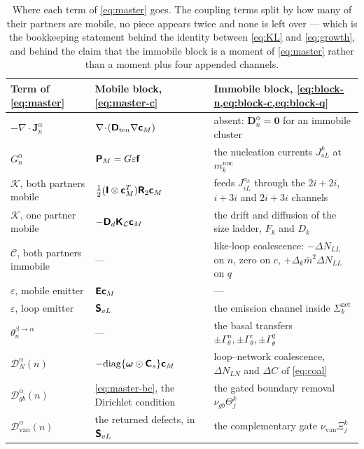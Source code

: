 \begin{table}[htbp]
\centering
\small
\caption{Where each term of \cref{eq:master} goes. The coupling terms split by
how many of their partners are mobile, no piece appears twice and none is left
over --- which is the bookkeeping statement behind the identity between
\cref{eq:KL} and \cref{eq:growth}, and behind the claim that the immobile block
is a moment of \cref{eq:master} rather than a moment plus four appended
channels.}
\label{tab:d-terms}
\begin{tabularx}{\textwidth}{@{}lXX@{}}
\toprule
Term of \cref{eq:master} & Mobile block, \cref{eq:master-c}
                         & Immobile block, \cref{eq:block-n,eq:block-c,eq:block-q}\\
\midrule
$-\nabla\!\cdot\!\bm J^\alpha_n$
  & $\nabla\!\cdot\!(\bm{\mathsf{D}}_{\mathrm{ten}}\nabla\bm{\mathsf{c}}_M)$
  & absent: $\bm D^\alpha_n=\bm0$ for an immobile cluster \\[3pt]
$G^\alpha_n$
  & $\bm{\mathsf{P}}_M=G\varepsilon\bm{\mathsf{f}}$
  & the nucleation currents $J^k_{sL}$ at $m^{\mathrm{nuc}}_k$ \\[3pt]
$\mathcal K$, both partners mobile
  & $\tfrac12(\bm{\mathsf{I}}\otimes\bm{\mathsf{c}}_M^{T})\bm{\mathsf{R}}_2\bm{\mathsf{c}}_M$
  & feeds $J^{a_k}_{iL}$ through the $2i\!+\!2i$, $i\!+\!3i$ and $2i\!+\!3i$ channels \\[3pt]
$\mathcal K$, one partner mobile
  & $-\bm{\mathsf{D}}_d\bm{\mathsf{K}}_{\mathcal L}\bm{\mathsf{c}}_M$
  & the drift and diffusion of the size ladder, $F_k$ and $D_k$ \\[3pt]
$\mathcal C$, both partners immobile
  & ---
  & like-loop coalescence: $-\Delta N_{LL}$ on $n$, zero on $c$,
    $+\Delta_k\bar m^{2}\Delta N_{LL}$ on $q$ \\[3pt]
$\varepsilon$, mobile emitter
  & $\bm{\mathsf{E}}\bm{\mathsf{c}}_M$
  & --- \\[3pt]
$\varepsilon$, loop emitter
  & $\bm{\mathsf{S}}_{vL}$
  & the emission channel inside $\Sigma^{\mathrm{net}}_k$ \\[3pt]
$\theta^{\beta\to\alpha}_n$
  & ---
  & the basal transfers $\pm\Gamma^{n}_\theta,\pm\Gamma^{c}_\theta,
    \pm\Gamma^{q}_\theta$ \\[3pt]
$\mathcal D^\alpha_N(n)$
  & $-\mathrm{diag}\{\bm{\mathsf{\omega}}\odot\bm{\mathsf{C}}_s\}\bm{\mathsf{c}}_M$
  & loop--network coalescence, $\Delta N_{LN}$ and $\Delta C$ of
    \cref{eq:coal} \\[3pt]
$\mathcal D^\alpha_{gb}(n)$
  & \cref{eq:master-bc}, the Dirichlet condition
  & the gated boundary removal $\nu_{gb}\Theta^k_j$ \\[3pt]
$\mathcal D^\alpha_{\mathrm{van}}(n)$
  & the returned defects, in $\bm{\mathsf{S}}_{vL}$
  & the complementary gate $\nu_{\mathrm{van}}\Xi^k_j$ \\
\bottomrule
\end{tabularx}
\end{table}

